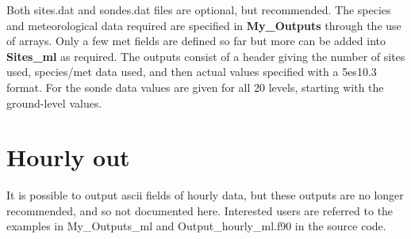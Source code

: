 Both sites.dat and sondes.dat files are optional, but recommended.
\newline
The species and meteorological data required are specified in {\bf My\_Outputs}
through the use of arrays. Only a few met fields are defined so far but
more can be added into {\bf Sites\_ml} as required. The outputs consist
of a header giving the number of sites used, species/met data used, and
then actual values specified with a 5es10.3 format. For the sonde data
values are given for all 20 levels, starting with the ground-level values.


\section{Hourly out}

It is possible to output ascii fields of hourly data, but these
outputs are no longer recommended, and so not documented here.
Interested users are referred to the examples in My\_Outputs\_ml
and Output\_hourly\_ml.f90 in the source code.





